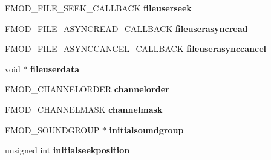 \begin{DoxyCompactItemize}
\item 
\hypertarget{struct_f_m_o_d___c_r_e_a_t_e_s_o_u_n_d_e_x_i_n_f_o_a9b9037a9d82085cf3517501953e4b1b3}{F\+M\+O\+D\+\_\+\+F\+I\+L\+E\+\_\+\+S\+E\+E\+K\+\_\+\+C\+A\+L\+L\+B\+A\+C\+K {\bfseries fileuserseek}}\label{struct_f_m_o_d___c_r_e_a_t_e_s_o_u_n_d_e_x_i_n_f_o_a9b9037a9d82085cf3517501953e4b1b3}

\item 
\hypertarget{struct_f_m_o_d___c_r_e_a_t_e_s_o_u_n_d_e_x_i_n_f_o_aef0eda031d70b37191b78a76c423f6d8}{F\+M\+O\+D\+\_\+\+F\+I\+L\+E\+\_\+\+A\+S\+Y\+N\+C\+R\+E\+A\+D\+\_\+\+C\+A\+L\+L\+B\+A\+C\+K {\bfseries fileuserasyncread}}\label{struct_f_m_o_d___c_r_e_a_t_e_s_o_u_n_d_e_x_i_n_f_o_aef0eda031d70b37191b78a76c423f6d8}

\item 
\hypertarget{struct_f_m_o_d___c_r_e_a_t_e_s_o_u_n_d_e_x_i_n_f_o_a05d88d38bdefb9ec1e37b5a61e9cf149}{F\+M\+O\+D\+\_\+\+F\+I\+L\+E\+\_\+\+A\+S\+Y\+N\+C\+C\+A\+N\+C\+E\+L\+\_\+\+C\+A\+L\+L\+B\+A\+C\+K {\bfseries fileuserasynccancel}}\label{struct_f_m_o_d___c_r_e_a_t_e_s_o_u_n_d_e_x_i_n_f_o_a05d88d38bdefb9ec1e37b5a61e9cf149}

\item 
\hypertarget{struct_f_m_o_d___c_r_e_a_t_e_s_o_u_n_d_e_x_i_n_f_o_a55e0c284a42bc714be64c7f965ab99c4}{void $\ast$ {\bfseries fileuserdata}}\label{struct_f_m_o_d___c_r_e_a_t_e_s_o_u_n_d_e_x_i_n_f_o_a55e0c284a42bc714be64c7f965ab99c4}

\item 
\hypertarget{struct_f_m_o_d___c_r_e_a_t_e_s_o_u_n_d_e_x_i_n_f_o_a29b8d2f1c167eca767fd9ecea44040f2}{F\+M\+O\+D\+\_\+\+C\+H\+A\+N\+N\+E\+L\+O\+R\+D\+E\+R {\bfseries channelorder}}\label{struct_f_m_o_d___c_r_e_a_t_e_s_o_u_n_d_e_x_i_n_f_o_a29b8d2f1c167eca767fd9ecea44040f2}

\item 
\hypertarget{struct_f_m_o_d___c_r_e_a_t_e_s_o_u_n_d_e_x_i_n_f_o_a132dbe42a3282207c8d83032ce39870f}{F\+M\+O\+D\+\_\+\+C\+H\+A\+N\+N\+E\+L\+M\+A\+S\+K {\bfseries channelmask}}\label{struct_f_m_o_d___c_r_e_a_t_e_s_o_u_n_d_e_x_i_n_f_o_a132dbe42a3282207c8d83032ce39870f}

\item 
\hypertarget{struct_f_m_o_d___c_r_e_a_t_e_s_o_u_n_d_e_x_i_n_f_o_a58fdf5de9dca7e42f5586d157d7453db}{F\+M\+O\+D\+\_\+\+S\+O\+U\+N\+D\+G\+R\+O\+U\+P $\ast$ {\bfseries initialsoundgroup}}\label{struct_f_m_o_d___c_r_e_a_t_e_s_o_u_n_d_e_x_i_n_f_o_a58fdf5de9dca7e42f5586d157d7453db}

\item 
\hypertarget{struct_f_m_o_d___c_r_e_a_t_e_s_o_u_n_d_e_x_i_n_f_o_abd2577182ac908d6af88d4610470e68c}{unsigned int {\bfseries initialseekposition}}\label{struct_f_m_o_d___c_r_e_a_t_e_s_o_u_n_d_e_x_i_n_f_o_abd2577182ac908d6af88d4610470e68c}


\end{DoxyCompactItemize}
